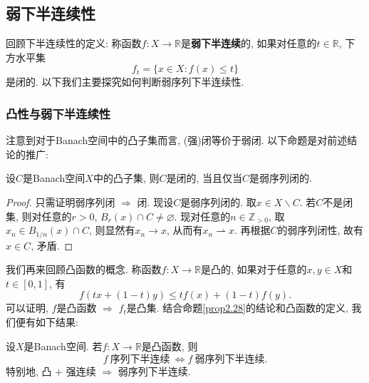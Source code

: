\subsection{弱下半连续性}

回顾下半连续性的定义: 称函数$f\colon X \rightarrow \mathbb{R}$是\textbf{弱下半连续}的, 如果对任意的$t \in \mathbb{R}$, 下方水平集
\begin{equation*}
    f_t = \{x \in X\colon f(x) \leq t\}
\end{equation*}
是闭的. 以下我们主要探究如何判断弱序列下半连续性.

\subsubsection{凸性与弱下半连续性}

注意到对于Banach空间中的凸子集而言, (强)闭等价于弱闭. 以下命题是对前述结论的推广:

\begin{proposition}\label{prop2.28}
    设$C$是Banach空间$X$中的凸子集, 则$C$是闭的, 当且仅当$C$是弱序列闭的.
    \begin{proof}
        只需证明弱序列闭 $\Rightarrow$ 闭. 现设$C$是弱序列闭的. 取$x \in X \smallsetminus C$.
        若$C$不是闭集, 则对任意的$r > 0$, $B_r(x) \cap C \neq \varnothing$. 
        现对任意的$n \in \mathbb{Z}_{>0}$, 取$x_n \in B_{1/n}(x) \cap C$, 则显然有$x_n \rightarrow x$, 从而有$x_n \rightharpoonup x$.
        再根据$C$的弱序列闭性, 故有$x \in C$, 矛盾. 
    \end{proof}
\end{proposition}

我们再来回顾凸函数的概念. 称函数$f\colon X \rightarrow \mathbb{R}$是凸的, 如果对于任意的$x, y \in X$和$t \in [0, 1]$, 有 
\begin{equation*}
    f(tx + (1 - t)y) \leq tf(x) + (1 - t)f(y).
\end{equation*}
可以证明, $f$是凸函数 $\Rightarrow$ $f_t$是凸集. 结合命题\ref{prop2.28}的结论和凸函数的定义, 我们便有如下结果:

\begin{proposition}
    设$X$是Banach空间. 若$f\colon X \rightarrow \mathbb{R}$是凸函数, 则 
    \begin{equation*}
        f\ \text{序列下半连续}\ \Longleftrightarrow f\ \text{弱序列下半连续}.
    \end{equation*}
    特别地, 凸 $+$ 强连续 $\Rightarrow$ 弱序列下半连续.
\end{proposition}

